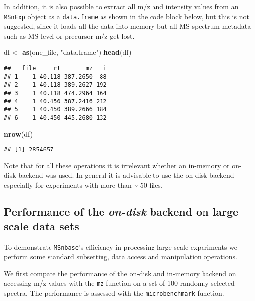 \documentclass[journal=jacsat,manuscript=suppinfo]{achemso}
\newenvironment{Shaded}{\begin{snugshade}}{\end{snugshade}}
\newcommand{\KeywordTok}[1]{\textcolor[rgb]{0.13,0.29,0.53}{\textbf{#1}}}
\newcommand{\NormalTok}[1]{#1}
\newcommand{\StringTok}[1]{\textcolor[rgb]{0.31,0.60,0.02}{#1}}
\begin{document}
In addition, it is also possible to extract all m/z and intensity values
from an \texttt{MSnExp} object as a \texttt{data.frame} as shown in the
code block below, but this is not suggested, since it loads all the data
into memory but all MS spectrum metadata such as MS level or precursor
m/z get lost.

\begin{Shaded}
\begin{Highlighting}[]
\NormalTok{df \textless{}{-}}\StringTok{ }\KeywordTok{as}\NormalTok{(one\_file, }\StringTok{"data.frame"}\NormalTok{)}
\KeywordTok{head}\NormalTok{(df)}
\end{Highlighting}
\end{Shaded}

\begin{verbatim}
##   file     rt       mz   i
## 1    1 40.118 387.2650  88
## 2    1 40.118 389.2627 192
## 3    1 40.118 474.2964 164
## 4    1 40.450 387.2416 212
## 5    1 40.450 389.2666 184
## 6    1 40.450 445.2680 132
\end{verbatim}

\begin{Shaded}
\begin{Highlighting}[]
\KeywordTok{nrow}\NormalTok{(df)}
\end{Highlighting}
\end{Shaded}

\begin{verbatim}
## [1] 2854657
\end{verbatim}

Note that for all these operations it is irrelevant whether an in-memory
or on-disk backend was used. In general it is advisable to use the
on-disk backend especially for experiments with more than
\textasciitilde{} 50 files.

\hypertarget{performance-of-the-on-disk-backend-on-large-scale-data-sets}{%
\subsection{\texorpdfstring{Performance of the \emph{on-disk} backend on
large scale data
sets}{Performance of the on-disk backend on large scale data sets}}\label{performance-of-the-on-disk-backend-on-large-scale-data-sets}}

To demonstrate \texttt{MSnbase}'s efficiency in processing large scale
experiments we perform some standard subsetting, data access and
manipulation operations.

We first compare the performance of the on-disk and in-memory backend on
accessing m/z values with the \texttt{mz} function on a set of 100
randomly selected spectra. The performance is assessed with the
\texttt{microbenchmark} function.
\end{document}
